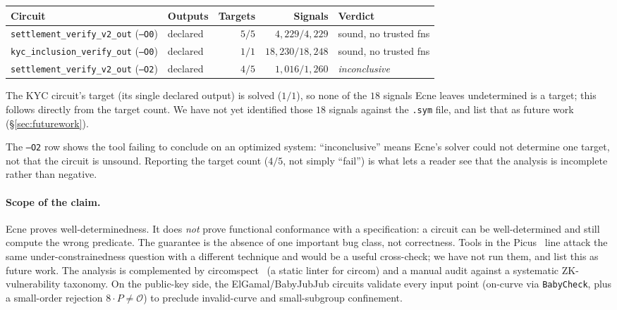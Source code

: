 \documentclass[11pt]{article}
\newcommand{\code}[1]{\texttt{#1}}
\begin{document}
\begin{center}
\small
\begin{tabular}{@{}llrrl@{}}
\toprule
\textbf{Circuit} & \textbf{Outputs} & \textbf{Targets} & \textbf{Signals} & \textbf{Verdict} \\
\midrule
\code{settlement\_verify\_v2\_out} (\code{--O0}) & declared & $5/5$ & $4{,}229/4{,}229$ & sound, no trusted fns \\
\code{kyc\_inclusion\_verify\_out} (\code{--O0}) & declared & $1/1$ & $18{,}230/18{,}248$ & sound, no trusted fns \\
\code{settlement\_verify\_v2\_out} (\code{--O2}) & declared & $4/5$ & $1{,}016/1{,}260$ & \emph{inconclusive} \\
\bottomrule
\end{tabular}
\end{center}

\noindent The KYC circuit's target (its single declared output) is solved
($1/1$), so none of the $18$ signals Ecne leaves undetermined is a target; this
follows directly from the target count. We have not yet identified those $18$
signals against the \code{.sym} file, and list that as future work
(\S\ref{sec:futurework}).

\noindent The \code{--O2} row shows the tool failing to conclude on an
optimized system: ``inconclusive'' means Ecne's solver could not determine one
target, not that the circuit is unsound. Reporting the target count ($4/5$, not
simply ``fail'') is what lets a reader see that the analysis is incomplete
rather than negative.

\paragraph{Scope of the claim.}
Ecne proves well-determinedness. It does \emph{not} prove functional
conformance with a specification: a circuit can be well-determined and still
compute the wrong predicate. The guarantee is the absence of one important bug
class, not correctness. Tools in the Picus~\cite{picus} line attack the same
under-constrainedness question with a different technique and would be a
useful cross-check; we have not run them, and list this as future work. The
analysis is complemented by circomspect~\cite{circomspect} (a static linter for
circom) and a manual audit against a systematic ZK-vulnerability taxonomy. On
the public-key side, the ElGamal/BabyJubJub circuits validate every input point
(on-curve via \code{BabyCheck}, plus a small-order rejection
$8\cdot P \neq \mathcal{O}$) to preclude invalid-curve and small-subgroup
confinement.
\end{document}
